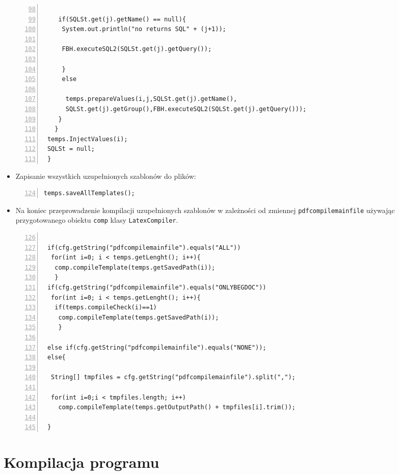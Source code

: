 \begin{itemize}
\begin{lstlisting}[numbers=left,firstnumber=98]
                
    if(SQLSt.get(j).getName() == null){
     System.out.println("no returns SQL" + (j+1)); 
                 
     FBH.executeSQL2(SQLSt.get(j).getQuery());
                
     }
     else
                  
      temps.prepareValues(i,j,SQLSt.get(j).getName(),
      SQLSt.get(j).getGroup(),FBH.executeSQL2(SQLSt.get(j).getQuery()));
    }
   }
 temps.InjectValues(i);
 SQLSt = null;
 } 
\end{lstlisting}


\vspace{5mm}
\item Zapisanie wszystkich uzupełnionych szablonów do plików:

 \begin{lstlisting}[numbers=left,firstnumber=124]
 temps.saveAllTemplates();
\end{lstlisting}
       
\vspace{5mm}
\item Na koniec przeprowadzenie kompilacji uzupełnionych szablonów w zależności od zmiennej \texttt{pdfcompilemainfile} używając przygotowanego obiektu \texttt{comp} klasy \texttt{LatexCompiler}.

       
\begin{lstlisting}[numbers=left,firstnumber=126]
       
 if(cfg.getString("pdfcompilemainfile").equals("ALL"))
  for(int i=0; i < temps.getLenght(); i++){
   comp.compileTemplate(temps.getSavedPath(i));
   }
 if(cfg.getString("pdfcompilemainfile").equals("ONLYBEGDOC"))
  for(int i=0; i < temps.getLenght(); i++){
   if(temps.compileCheck(i)==1)
    comp.compileTemplate(temps.getSavedPath(i));
    }
      
 else if(cfg.getString("pdfcompilemainfile").equals("NONE"));
 else{
          
  String[] tmpfiles = cfg.getString("pdfcompilemainfile").split(",");
          
  for(int i=0;i < tmpfiles.length; i++)
    comp.compileTemplate(temps.getOutputPath() + tmpfiles[i].trim());
  
 }
\end{lstlisting}

\end{itemize}
\section{Kompilacja programu}

